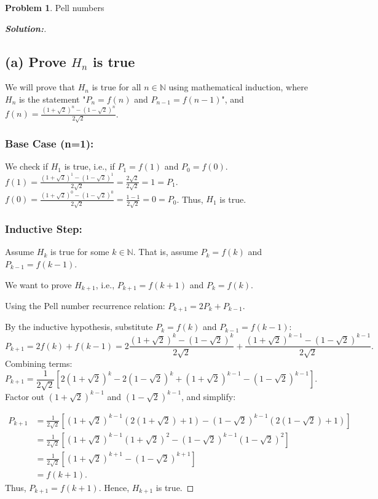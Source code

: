 \documentclass[12pt]{article}
\theoremstyle{definition}\newtheorem{problem}{Problem}
\newenvironment{solution}{\begin{proof}[\bfseries\textup{Solution:}]}{\end{proof}}
\newcommand{\N}{\mathbb{N}}
\begin{document}
\newpage
\begin{problem} Pell numbers
\end{problem}
\begin{solution}
\subsection*{(a) Prove $ H_{n} $  is true} 

We will prove that $H_n$ is true for all $n \in \N$ using mathematical induction, where $H_n$ is the statement "$P_n = f(n)$ and $P_{n-1} = f(n-1)$", and $f(n) = \frac{(1+\sqrt2)^n - (1-\sqrt2)^n}{2\sqrt2}$.

\subsubsection*{Base Case (n=1):}
   We check if $H_1$ is true, i.e., if $P_1 = f(1)$ and $P_0 = f(0)$.
   $f(1) = \frac{(1+\sqrt2)^1 - (1-\sqrt2)^1}{2\sqrt2} = \frac{2\sqrt2}{2\sqrt2} = 1 = P_1$.
   $f(0) = \frac{(1+\sqrt2)^0 - (1-\sqrt2)^0}{2\sqrt2} = \frac{1 - 1}{2\sqrt2} = 0 = P_0$.
   Thus, $H_1$ is true.

\subsubsection*{Inductive Step:}
   Assume $H_k$ is true for some $k \in \N$. That is, assume $P_k = f(k)$ and $P_{k-1} = f(k-1)$.


   We want to prove $H_{k+1}$, i.e., $P_{k+1} = f(k+1)$ and $P_k = f(k)$. 

   Using the Pell number recurrence relation: $P_{k+1} = 2P_k + P_{k-1}$.

   By the inductive hypothesis, substitute $P_k = f(k)$ and $P_{k-1} = f(k-1)$:
   $$P_{k+1} = 2f(k) + f(k-1) = 2\frac{(1+\sqrt2)^k - (1-\sqrt2)^k}{2\sqrt2} + \frac{(1+\sqrt2)^{k-1} - (1-\sqrt2)^{k-1}}{2\sqrt2}.$$
   Combining terms:
   $$P_{k+1} = \frac{1}{2\sqrt2} \left[ 2(1+\sqrt2)^k - 2(1-\sqrt2)^k + (1+\sqrt2)^{k-1} - (1-\sqrt2)^{k-1} \right].$$
   Factor out $(1+\sqrt2)^{k-1}$ and $(1-\sqrt2)^{k-1}$, and simplify:

   \begin{align*}P_{k+1} &= \frac{1}{2\sqrt2} \left[ (1+\sqrt2)^{k-1}(2(1+\sqrt2) + 1) - (1-\sqrt2)^{k-1}(2(1-\sqrt2) + 1) \right]
  \\ &= \frac{1}{2\sqrt2} \left[ (1+\sqrt2)^{k-1}(1+\sqrt2)^2 - (1-\sqrt2)^{k-1}(1-\sqrt2)^2 \right] \\ &= \frac{1}{2\sqrt2} \left[ (1+\sqrt2)^{k+1} - (1-\sqrt2)^{k+1} \right] \\&= f(k+1).\end{align*}
   Thus, $P_{k+1} = f(k+1)$. Hence, $H_{k+1}$ is true.


\end{solution}
\end{document}
